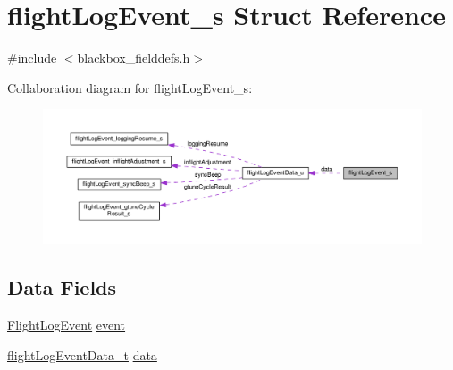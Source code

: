 \hypertarget{structflightLogEvent__s}{\section{flight\+Log\+Event\+\_\+s Struct Reference}
\label{structflightLogEvent__s}
}


{\ttfamily \#include $<$blackbox\+\_\+fielddefs.\+h$>$}



Collaboration diagram for flight\+Log\+Event\+\_\+s\+:\nopagebreak
\begin{figure}[H]
\begin{center}
\leavevmode
\includegraphics[width=350pt]{structflightLogEvent__s__coll__graph}
\end{center}
\end{figure}
\subsection*{Data Fields}
\begin{DoxyCompactItemize}
\item 
\hyperlink{blackbox__fielddefs_8h_a3a7a914eae451a55cbd0e80a9dbaf64c}{Flight\+Log\+Event} \hyperlink{structflightLogEvent__s_ac1a26453ad18bfacafd36354e286d0bf}{event}
\item 
\hyperlink{blackbox__fielddefs_8h_a525446c1bf42d5ca29c28d9979b28b1e}{flight\+Log\+Event\+Data\+\_\+t} \hyperlink{structflightLogEvent__s_a64a0a11339c309f780f20c8401477ac2}{data}
\end{DoxyCompactItemize}


